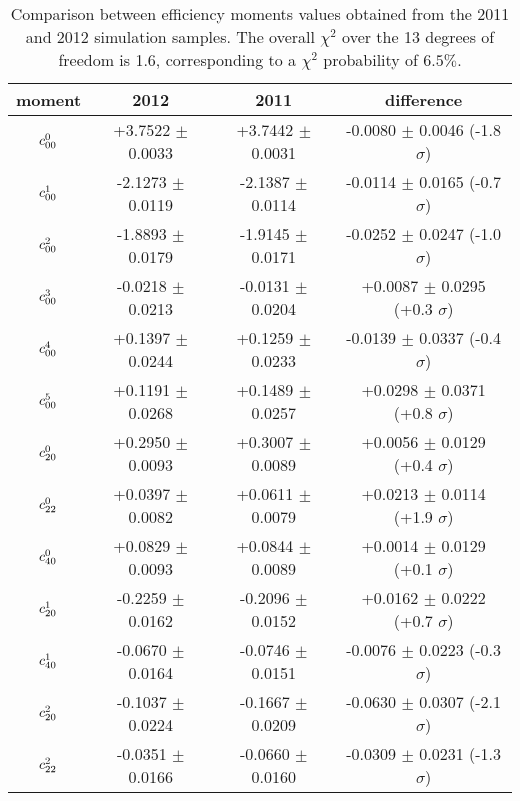 
\begin{table}
\centering
\footnotesize
\begin{tabular}{c c c c}
  \hline
        moment         &  2012    &    2011  &   difference                        \\
  \hline
  $c^{0}_{00}$   & +3.7522 $\pm$  0.0033  &  +3.7442 $\pm$  0.0031  &  -0.0080 $\pm$  0.0046 (-1.8 $\sigma$) \\
  $c^{1}_{00}$   & -2.1273 $\pm$  0.0119  &  -2.1387 $\pm$  0.0114  &  -0.0114 $\pm$  0.0165 (-0.7 $\sigma$) \\
  $c^{2}_{00}$   & -1.8893 $\pm$  0.0179  &  -1.9145 $\pm$  0.0171  &  -0.0252 $\pm$  0.0247 (-1.0 $\sigma$) \\
  $c^{3}_{00}$   & -0.0218 $\pm$  0.0213  &  -0.0131 $\pm$  0.0204  &  +0.0087 $\pm$  0.0295 (+0.3 $\sigma$) \\
  $c^{4}_{00}$   & +0.1397 $\pm$  0.0244  &  +0.1259 $\pm$  0.0233  &  -0.0139 $\pm$  0.0337 (-0.4 $\sigma$) \\
  $c^{5}_{00}$   & +0.1191 $\pm$  0.0268  &  +0.1489 $\pm$  0.0257  &  +0.0298 $\pm$  0.0371 (+0.8 $\sigma$) \\
  $c^{0}_{20}$   & +0.2950 $\pm$  0.0093  &  +0.3007 $\pm$  0.0089  &  +0.0056 $\pm$  0.0129 (+0.4 $\sigma$) \\
  $c^{0}_{22}$   & +0.0397 $\pm$  0.0082  &  +0.0611 $\pm$  0.0079  &  +0.0213 $\pm$  0.0114 (+1.9 $\sigma$) \\
  $c^{0}_{40}$   & +0.0829 $\pm$  0.0093  &  +0.0844 $\pm$  0.0089  &  +0.0014 $\pm$  0.0129 (+0.1 $\sigma$) \\
  $c^{1}_{20}$   & -0.2259 $\pm$  0.0162  &  -0.2096 $\pm$  0.0152  &  +0.0162 $\pm$  0.0222 (+0.7 $\sigma$) \\
  $c^{1}_{40}$   & -0.0670 $\pm$  0.0164  &  -0.0746 $\pm$  0.0151  &  -0.0076 $\pm$  0.0223 (-0.3 $\sigma$) \\
  $c^{2}_{20}$   & -0.1037 $\pm$  0.0224  &  -0.1667 $\pm$  0.0209  &  -0.0630 $\pm$  0.0307 (-2.1 $\sigma$) \\
  $c^{2}_{22}$   & -0.0351 $\pm$  0.0166  &  -0.0660 $\pm$  0.0160  &  -0.0309 $\pm$  0.0231 (-1.3 $\sigma$) \\
  \hline
\end{tabular}
\caption{Comparison between efficiency moments values obtained from the 2011 and 2012 \BsbarJpsiKst simulation samples.
         The overall $\chi^2$ over the 13 degrees of freedom is 1.6, corresponding to a $\chi^2$ probability of $6.5\%$.}
\label{moms_comp_periods_pos}
\end{table}

